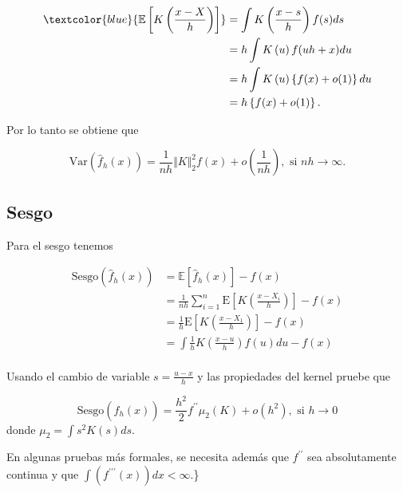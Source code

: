 \documentclass[
  12pt,
]{book}
\begin{document}
\begin{align*}
\textcolor{blue}{\mathbb{E}\left[K\left(\frac{x-X}{h}\right)\right]}
& =\int K\left(\frac{x-s}{h}\right)f(s)ds            \\
& = h\int K\left(u\right)f(uh+x)du                    \\
& =h\int K\left(u\right)\left\{ f(x)+o(1)\right\} du \\
& =h\left\{f(x)+o(1)\right\} .
\end{align*}

Por lo tanto se obtiene que

\begin{equation*}
\mathrm{Var}\left(\hat{f}_{h}(x)\right) = \frac{1}{nh} \Vert K\Vert_{2}^{2}f(x) + o\left(\frac{1}{nh}\right), \text{ si } nh\to \infty.
\end{equation*}

\hypertarget{sesgo-1}{%
\subsection{Sesgo}\label{sesgo-1}}

Para el sesgo tenemos

\begin{align*}
\mathrm{Sesgo}\left(\hat{f}_{h}(x)\right)
& = \mathbb{E}\left[\hat{f}_{h}(x)\right]-f(x)                                                  \\
& = \frac{1}{nh} \sum_{i=1}^{n} \mathrm{E}\left[K\left( \frac{x-X_{i}}{h} \right)\right] - f(x) \\
& = \frac{1}{h}\mathrm{E}\left[K\left( \frac{x-X_{1}}{h} \right)\right] - f(x)                  \\
& = \int \frac{1}{h} K\left( \frac{x-u}{h}\right)f(u)du -f(x)                                   \\
\end{align*}

\leavevmode{}%
Usando el cambio de variable \(s=\frac{u-x}{h}\) y las propiedades del
kernel pruebe que

\begin{equation*}
\mathrm{Sesgo}\left(\hat{f}_{h}(x)\right) = \frac{h^{2}}{2} f^{\prime\prime} \mu_{2}(K) + o(h^{2}), \text{ si } h\to 0
\end{equation*} donde \(\mu_{2}=\int s^{2}K(s)ds\).

En algunas pruebas más formales, se necesita además que
\(f^{\prime\prime}\) sea absolutamente continua y que
\(\int(f^{\prime\prime\prime}(x))dx<\infty\).\}
\end{document}
